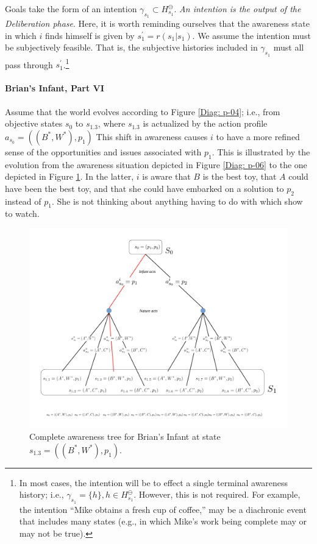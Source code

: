 \documentclass[
11pt,
titlepage,
reqno,
]{article}%
\theoremstyle{definition}
\begin{document}
Goals take the form of an intention $\gamma_{s_1}\subset H^\ominus_{s_1}$.
\textit{An intention is the output of the Deliberation phase}.
Here, it is worth reminding ourselves that the awareness state in which $i$ finds himself is given by $s^\prime_1=r(s_1|s_1)$.
We assume the intention must be subjectively feasible.
That is, the subjective histories included in $\gamma_{s_1}$ must all pass through $s^\prime_1$.\footnote
{
	In most cases, the intention will be to effect a single terminal awareness history; i.e., $\gamma_{s_1}=\{h\}, h\in H^\ominus_{s_1}$. 
	However, this is not required. 
	For example, the intention ``Mike obtains a fresh cup of coffee,'' may be a diachronic event that includes many states (e.g., in which Mike's work being complete may or may not be true).
}
 

\paragraph{Brian's Infant, Part VI}
Assume that the world evolves according to Figure \ref{Diag: p-04}; i.e., from objective states $s_0$ to $s_{1.3}$, where $s_{1.3}$ is actualized by the action profile $a_{s_0}=((B^\ast,W^\ast),p_1)$
This shift in awareness causes $i$ to have a more refined sense of the opportunities and issues associated with $p_1$.
This is illustrated by the evolution from the awareness situation depicted in Figure \ref{Diag: p-06} to the one depicted in Figure \ref{Diag: p-07}. 
In the latter, $i$ is aware that $B$ is the best toy, that $A$ could have been the best toy, and that she could have embarked on a solution to $p_2$ instead of $p_1$. 
She is not thinking about anything having to do with which show to watch.

\begin{figure}[h!]
	\centering
	\includegraphics*[page=7,trim = 3in 0in 1in 0in,scale=.7]{Awareness_Diagrams_All}
	\caption{Complete awareness tree for Brian's Infant at state $s_{1.3}=((B^\ast,W^\ast),p_1)$.\label{Diag: p-07}}%
\end{figure}
\end{document}
